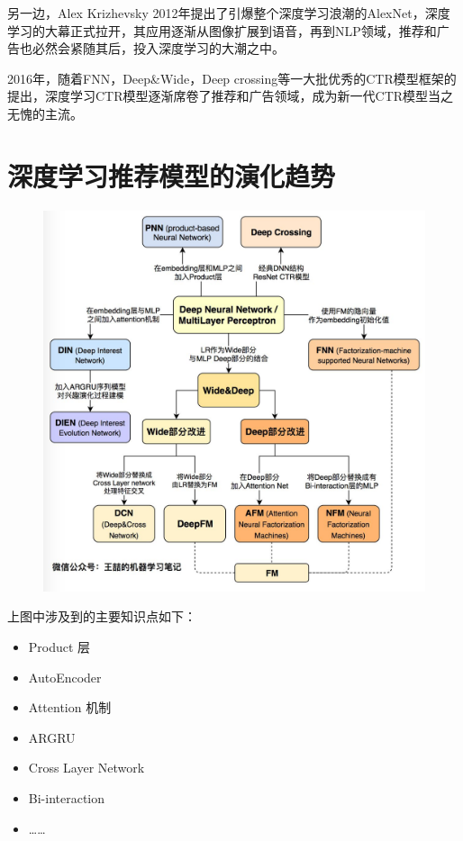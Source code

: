 \documentclass[12pt]{article}
\begin{document}
另一边，Alex Krizhevsky 2012年提出了引爆整个深度学习浪潮的AlexNet，深度学习的大幕正式拉开，其应用逐渐从图像扩展到语音，再到NLP领域，推荐和广告也必然会紧随其后，投入深度学习的大潮之中。

2016年，随着FNN，Deep\&Wide，Deep crossing等一大批优秀的CTR模型框架的提出，深度学习CTR模型逐渐席卷了推荐和广告领域，成为新一代CTR模型当之无愧的主流。

\part{深度学习推荐模型的演化趋势}
\begin{figure}[H]
    \centering
    \includegraphics[width=1\textwidth]{fig/Deep_Learning_Reference_System_Evolution.jpg}
\end{figure}

上图中涉及到的主要知识点如下：
\begin{itemize}
\setlength{\itemsep}{0pt}
\setlength{\parsep}{0pt}
\setlength{\parskip}{0pt}
    \item Product 层
    \item AutoEncoder
    \item Attention 机制
    \item ARGRU
    \item Cross Layer Network
    \item Bi-interaction
    \item ……
\end{itemize}
\end{document}
